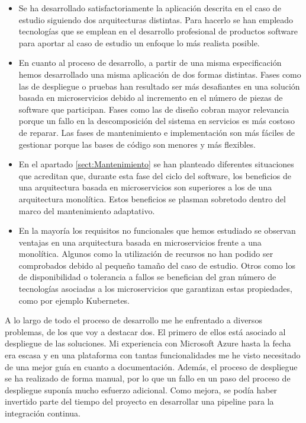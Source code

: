\documentclass[11pt,spanish,listoffigures]{tfgetsinf}
\begin{document}
\begin{itemize}

\item Se ha desarrollado satisfactoriamente la aplicación descrita en el caso de estudio siguiendo dos arquitecturas distintas. Para hacerlo se han empleado tecnologías que se emplean en el desarrollo profesional de productos software para aportar al caso de estudio un enfoque lo más realista posible.

\item En cuanto al proceso de desarrollo, a partir de una misma especificación hemos desarrollado una misma aplicación de dos formas distintas. Fases como las de despliegue o pruebas han resultado ser más desafiantes en una solución basada en microservicios debido al incremento en el número de piezas de software que participan. Fases como las de diseño cobran mayor relevancia porque un fallo en la descomposición del sistema en servicios es más costoso de reparar. Las fases de mantenimiento e implementación son más fáciles de gestionar porque las bases de código son menores y más flexibles.

\item En el apartado \ref{sect:Mantenimiento}  se han planteado diferentes situaciones que acreditan que, durante esta fase del ciclo del software, los beneficios de una arquitectura basada en microservicios son superiores a los de una arquitectura monolítica. Estos beneficios se plasman sobretodo dentro del marco del mantenimiento adaptativo.

\item En la mayoría los requisitos no funcionales que hemos estudiado se observan ventajas en una arquitectura basada en microservicios frente a una monolítica. Algunos como la utilización de recursos no han podido ser comprobados debido al pequeño tamaño del caso de estudio. Otros como los de disponibilidad o tolerancia a fallos se benefician del gran número de tecnologías asociadas a los microservicios que garantizan estas propiedades, como por ejemplo Kubernetes.

\end{itemize}

A lo largo de todo el proceso de desarrollo me he enfrentado a diversos problemas, de los que voy a destacar dos. El primero de ellos está asociado al despliegue de las soluciones. Mi experiencia con Microsoft Azure hasta la fecha era escasa y en una plataforma con tantas funcionalidades me he visto necesitado de una mejor guía en cuanto a documentación. Además, el proceso de despliegue se ha realizado de forma manual, por lo que un fallo en un paso del proceso de despliegue suponía mucho esfuerzo adicional. Como mejora, se podía haber invertido parte del tiempo del proyecto en desarrollar una pipeline para la integración continua.
\end{document}
